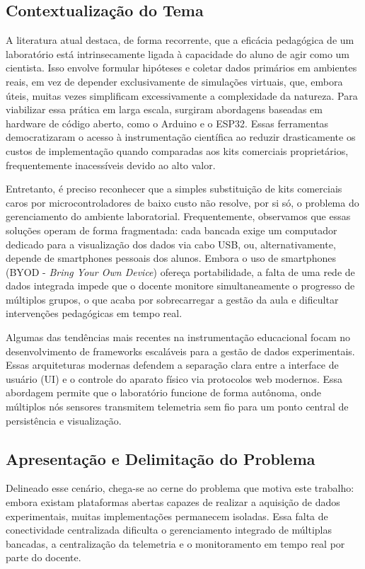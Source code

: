 \subsection{Contextualização do Tema}

A literatura atual destaca, de forma recorrente, que a eficácia pedagógica de um laboratório está intrinsecamente ligada à capacidade do aluno de agir como um cientista. Isso envolve formular hipóteses e coletar dados primários em ambientes reais, em vez de depender exclusivamente de simulações virtuais, que, embora úteis, muitas vezes simplificam excessivamente a complexidade da natureza. Para viabilizar essa prática em larga escala, surgiram abordagens baseadas em hardware de código aberto, como o Arduino e o ESP32. Essas ferramentas democratizaram o acesso à instrumentação científica ao reduzir drasticamente os custos de implementação quando comparadas aos kits comerciais proprietários, frequentemente inacessíveis devido ao alto valor.

Entretanto, é preciso reconhecer que a simples substituição de kits comerciais caros por microcontroladores de baixo custo não resolve, por si só, o problema do gerenciamento do ambiente laboratorial. Frequentemente, observamos que essas soluções operam de forma fragmentada: cada bancada exige um computador dedicado para a visualização dos dados via cabo USB, ou, alternativamente, depende de smartphones pessoais dos alunos. Embora o uso de smartphones (BYOD - \textit{Bring Your Own Device}) ofereça portabilidade, a falta de uma rede de dados integrada impede que o docente monitore simultaneamente o progresso de múltiplos grupos, o que acaba por sobrecarregar a gestão da aula e dificultar intervenções pedagógicas em tempo real.

Algumas das tendências mais recentes na instrumentação educacional focam no desenvolvimento de frameworks escaláveis para a gestão de dados experimentais. Essas arquiteturas modernas defendem a separação clara entre a interface de usuário (UI) e o controle do aparato físico via protocolos web modernos. Essa abordagem permite que o laboratório funcione de forma autônoma, onde múltiplos nós sensores transmitem telemetria sem fio para um ponto central de persistência e visualização.

\subsection{Apresentação e Delimitação do Problema}

Delineado esse cenário, chega-se ao cerne do problema que motiva este trabalho: embora existam plataformas abertas capazes de realizar a aquisição de dados experimentais, muitas implementações permanecem isoladas. Essa falta de conectividade centralizada dificulta o gerenciamento integrado de múltiplas bancadas, a centralização da telemetria e o monitoramento em tempo real por parte do docente.

